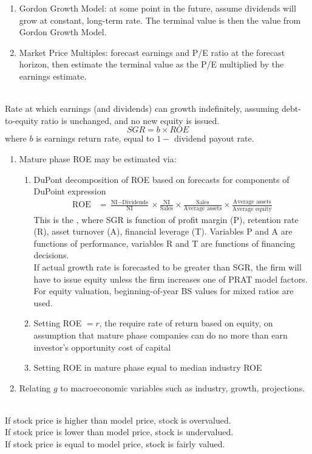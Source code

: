 \begin{method} 
\begin{enumerate}[label=\roman*.]
\setlength{\itemsep}{0pt}
\item Gordon Growth Model: at some point in the future, assume dividends will grow at constant, long-term rate. The terminal value is then the value from Gordon Growth Model.
\item Market Price Multiples: forecast earnings and P/E ratio at the forecast horizon, then estimate the terminal value as the P/E multiplied by the earnings estimate.
\end{enumerate}
\end{method}

\begin{method} \\
Rate at which earnings (and dividends) can growth indefinitely, assuming debt-to-equity ratio is unchanged, and no new equity is issued.
\begin{equation}
SGR = b \times ROE \nonumber
\end{equation}
where $b$ is earnings return rate, equal to $1 - $ dividend payout rate.
\begin{enumerate}[label=\roman*.]
\setlength{\itemsep}{0pt}
\item Mature phase ROE may be estimated via:
\begin{enumerate}[label=\arabic*.]
\setlength{\itemsep}{0pt}
\item DuPont decomposition of ROE based on forecasts for components of DuPoint expression
\begin{align}
\text{ROE} &= \frac{\text{NI} - \text{Dividends}}{\text{NI}} \times \frac{\text{NI}}{\text{Sales}} \times \frac{\text{Sales}}{\text{Average assets}} \times \frac{\text{Average assets}}{\text{Average equity}} \nonumber
\end{align}
This is the , where SGR is function of profit margin (P), retention rate (R), asset turnover (A), financial leverage (T). Variables P and A are functions of performance, variables R and T are functions of financing decisions.\\
If actual growth rate is forecasted to be greater than SGR, the firm will have to issue equity unless the firm increases one of PRAT model factors.\\
For equity valuation, beginning-of-year BS values for mixed ratios are used.
\item Setting ROE $=r$, the require rate of return based on equity, on assumption that mature phase companies can do no more than earn investor's opportunity cost of capital
\item Setting ROE in mature phase equal to median industry ROE
\end{enumerate}
\item Relating $g$ to macroeconomic variables such as industry, growth, projections.
\end{enumerate}
\end{method}

\begin{definition} \\
If stock price is higher than model price, stock is overvalued.\\
If stock price is lower than model price, stock is undervalued.\\
If stock price is equal to model price, stock is fairly valued.
\end{definition}